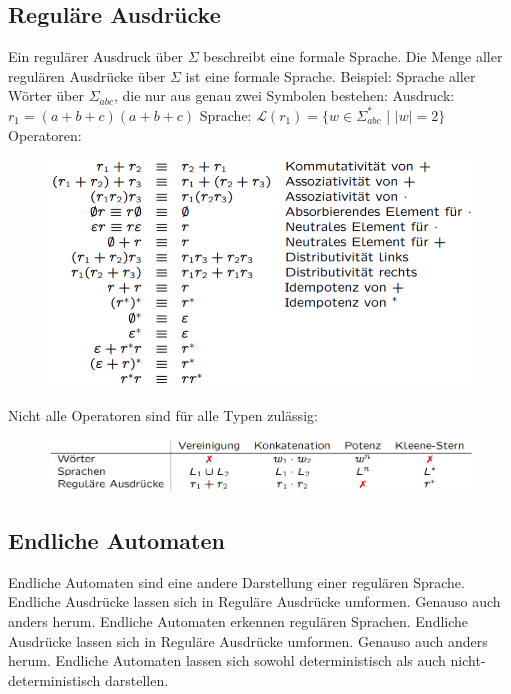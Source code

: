 \documentclass[12pt,a4paper]{article}
\begin{document}
	\subsection{Reguläre Ausdrücke}
	Ein regulärer Ausdruck über $\varSigma$ beschreibt eine formale Sprache.\newline
	Die Menge aller regulären Ausdrücke über $\varSigma$ ist eine formale Sprache.\newline\newline
	Beispiel: Sprache aller Wörter über $\varSigma_{abc}$, die nur aus genau zwei Symbolen bestehen:\newline
	Ausdruck: $r_1 = (a + b + c)(a + b + c)$\newline
	Sprache: $\mathcal{L}(r_1) = \{ w \in \varSigma_{abc}^*$ | $|w| = 2\}$\newline
	\noindent Operatoren:
	\begin{center}
		\begin{figure}[!h]
			\includegraphics[width=\textwidth]{Bilder/RegulaereAusdruecke_Operatoren.PNG}
		\end{figure}
	\end{center}
	Nicht alle Operatoren sind für alle Typen zulässig:
	\begin{center}
		\begin{figure}[!h]
			\includegraphics[width=\textwidth]{Bilder/Zulaessige_Operatoren.PNG}
		\end{figure}
	\end{center}

	\subsection{Endliche Automaten}
	Endliche Automaten sind eine andere Darstellung einer regulären Sprache. Endliche Ausdrücke lassen sich in Reguläre Ausdrücke umformen. Genauso auch anders herum.\newline
	Endliche Automaten erkennen regulären Sprachen. Endliche Ausdrücke lassen sich in Reguläre Ausdrücke umformen. Genauso auch anders herum.\newline
	Endliche Automaten lassen sich sowohl deterministisch als auch nicht-deterministisch darstellen.
\end{document}
